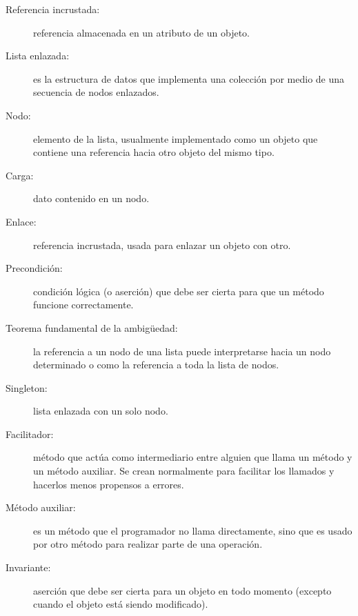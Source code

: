   
  
   
  
 
\begin{description}
\item [{Referencia incrustada:}] referencia almacenada en un atributo
de un objeto.
\item [{Lista enlazada:}] es la estructura de datos que implementa una
colección por medio de una secuencia de nodos enlazados.
\item [{Nodo:}] elemento de la lista, usualmente implementado como un objeto
que contiene una referencia hacia otro objeto del mismo tipo.
\item [{Carga:}] dato contenido en un nodo.
\item [{Enlace:}] referencia incrustada, usada para enlazar un objeto con
otro.
\item [{Precondición:}] condición lógica (o aserción) que debe ser cierta
para que un método funcione correctamente.
\item [{Teorema fundamental de la ambigüedad:}] la referencia a un nodo
de una lista puede interpretarse hacia un nodo determinado o como
la referencia a toda la lista de nodos.
\item [{Singleton:}] lista enlazada con un solo nodo.
\item [{Facilitador:}] método que actúa como intermediario entre alguien
que llama un método y un método auxiliar. Se crean normalmente para
facilitar los llamados y hacerlos menos propensos a errores.
\item [{Método auxiliar:}] es un método que el programador no llama directamente,
sino que es usado por otro método para realizar parte de una operación.
\item [{Invariante:}] aserción que debe ser cierta para un objeto en todo
momento (excepto cuando el objeto está siendo modificado).
\end{description}

